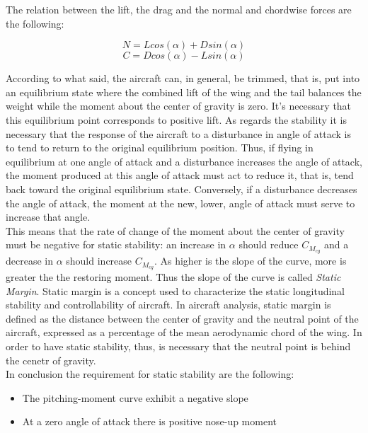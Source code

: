 The relation between the lift, the drag and the normal and chordwise forces are the following:

\begin{equation}
N =L cos({\alpha}) + D sin({\alpha})
\end{equation}
\begin{equation}
C = D cos({\alpha}) - L sin({\alpha})
\end{equation}

According to what said, the aircraft can, in general, be trimmed, that is, put into an equilibrium state where the combined lift of the wing and the tail balances the weight while the moment about the center of gravity is zero. It's necessary that this equilibrium point corresponds to positive lift. As regards the stability it is necessary that the response of the aircraft to a disturbance in angle of attack is to tend to return to the original equilibrium position. Thus, if flying in equilibrium at one angle of attack and a disturbance increases the angle of attack, the moment produced at this angle of attack must act to reduce it, that is, tend back toward the original equilibrium state. Conversely, if a disturbance decreases the angle of attack, the moment at the new, lower, angle of attack must serve to increase that angle. \\
This means that the rate of change of the moment about the center of gravity must be negative for static stability: an increase in $\alpha$ should reduce $C_{M_{cg}}$ and a decrease in $\alpha$ should increase $C_{M_{cg}}$.\cite{sforza2014commercial} As higher is the   slope of the curve, more is greater the the restoring moment. Thus the slope of the curve is called {\itshape Static Margin}.  Static margin is a concept used to characterize the static longitudinal stability and controllability of aircraft.
In aircraft analysis, static margin is defined as the distance between the center of gravity and the neutral point of the aircraft, expressed as a percentage of the mean aerodynamic chord of the wing.  In order to have static stability, thus, is necessary that the neutral point is behind the cenetr of gravity.\\

In conclusion the requirement for static stability are the following:
\begin{itemize}
\item The pitching-moment curve exhibit a negative slope 
\item At a zero angle of attack there is positive nose-up moment
\end{itemize}


